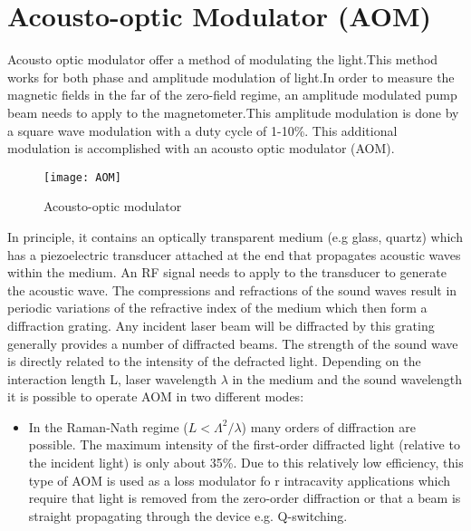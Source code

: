 \documentclass[12pt]{report}
\begin{document}
\section{Acousto-optic Modulator (AOM)}
Acousto optic modulator offer a method of modulating the light.This method works for both phase and amplitude modulation of light.In order to measure the magnetic fields in the far of the zero-field regime, an amplitude modulated pump beam needs to apply to the magnetometer.This amplitude modulation is done by a square wave modulation with a duty cycle of 1-10\%. This additional modulation is accomplished with an acousto optic modulator (AOM).
\begin{figure}[h]
\centering
\texttt{[image: AOM]}
\caption{Acousto-optic modulator}
\end{figure}
In principle, it contains an optically transparent medium (e.g glass, quartz) which has a piezoelectric transducer attached at the end that propagates acoustic waves within the medium. An RF signal needs to apply to the transducer to generate the acoustic wave. The compressions and refractions of the sound waves result in periodic variations of the refractive index of the medium which then form a diffraction grating. Any incident laser beam will be diffracted by this grating generally provides a number of diffracted beams. The strength of the sound wave is directly related to the intensity of the defracted light. Depending on the interaction length L, laser wavelength $\lambda$ in the medium and the sound wavelength it is possible to operate AOM in two different modes: 
\begin{itemize}
\item  In the Raman-Nath regime ($L<\Lambda^2/\lambda$) many orders of diffraction are possible. The maximum intensity of the first-order diffracted light (relative to the incident light) is only about 35\%. Due to this relatively low efficiency, this type of AOM is used as a loss modulator fo r intracavity applications which require that light is removed from the zero-order diffraction or that a beam is straight propagating through the device e.g. Q-switching.


\end{itemize}
\end{document}
